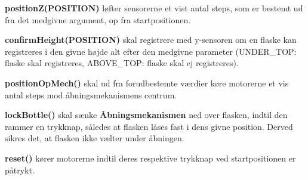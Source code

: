\textbf{positionZ(POSITION)} løfter sensorerne et vist antal steps, som er bestemt ud fra det medgivne argument, op fra startpositionen.

\textbf{confirmHeight(POSITION)} skal registrere med y-sensoren om en flaske kan registreres i den givne højde alt efter den medgivne parameter (UNDER\_TOP: flaske skal registreres, ABOVE\_TOP: flaske skal ej registreres).

\textbf{positionOpMech()} skal ud fra forudbestemte værdier køre motorerne et vis antal steps mod åbningsmekanismens centrum.

\textbf{lockBottle()} skal sænke \textbf{Åbningsmekanismen} ned over flasken, indtil den rammer en trykknap, således at flasken låses fast i dens givne position. Derved sikres det, at flasken ikke vælter under åbningen.

\textbf{reset()} kører motorerne indtil deres respektive trykknap ved startpositionen er påtrykt.
